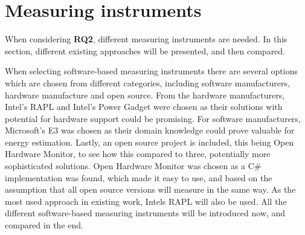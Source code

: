 \section{Measuring instruments}\label{sec:measuring_instruments}

When considering \textbf{RQ2}, different measuring instruments are needed. In this section, different existing approaches will be presented, and then compared.

When selecting software-based measuring instruments there are several options which are chosen from different categories, including software manufacturers, hardware manufacture and open source. From the hardware manufacturers, Intel's RAPL and Intel's Power Gadget were chosen as their solutions with potential for hardware support could be promising. For software manufacturers, Microsoft's E3 was chosen as their domain knowledge could prove valuable for energy estimation. Lastly, an open source project is included, this being Open Hardware Monitor, to see how this compared to three, potentially more sophisticated solutions. Open Hardware Monitor was chosen as a C\# implementation was found, which made it easy to use, and based on the assumption that all open source versions will measure in the same way. As the most used approach in existing work, Intels RAPL will also be used. All the different software-based measuring instruments will be introduced now, and compared in the end.






